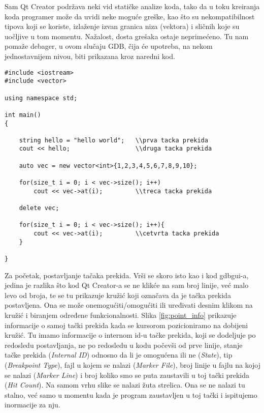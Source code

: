 \documentclass[a4paper]{article}
\begin{document}
Sam Qt Creator podržava neki vid statičke analize koda, tako da u toku kreiranja koda programer može da 
uvidi neke moguće greške, kao što su nekompatibilnost tipova koji se koriste, izlaženje izvan granica niza (vektora) 
i sličnih koje su uočljive u tom momentu. Nažalost, dosta grešaka ostaje neprimećeno. Tu nam pomaže debager,
u ovom slučaju GDB, čija će upotreba, na nekom jednostavnijem nivou, biti prikazana kroz naredni kod. 

\begin{lstlisting}[caption={Primer jednostavnog programa za prikaz rada GDB-a u Qt Creator-u},frame=single, label=simple]
#include <iostream>
#include <vector>

using namespace std;

int main()
{

    string hello = "hello world";   \\prva tacka prekida
    cout << hello;                  \\druga tacka prekida

    auto vec = new vector<int>{1,2,3,4,5,6,7,8,9,10};

    for(size_t i = 0; i < vec->size(); i++)
        cout << vec->at(i);         \\treca tacka prekida

    delete vec;

    for(size_t i = 0; i < vec->size(); i++){
        cout << vec->at(i);         \\cetvrta tacka prekida
    }

}
\end{lstlisting}

Za početak, postavljanje tačaka prekida. Vrši se skoro isto kao i kod gdbgui-a, jedina je razlika što kod Qt Creator-a
se ne klikće na sam broj linije, već malo levo od broja, te se tu prikazuje kružić koji označava da je
tačka prekida postavljena. Ona se može onemogućiti/omogućiti ili uređivati desnim klikom na kružić i biranjem određene funkcionalnosti.
Slika \ref{fig:point_info} prikazuje informacije o samoj tački prekida kada se
kursorom pozicioniramo na dobijeni kružić. Tu imamo informacije o internom id-u tačke prekida, koji se dodeljuje
po redosledu postavljanja, ne po redosledu u kodu počevši od prve linije, stanje tačke prekida (\textit{Internal ID}) 
odnosno da li je omogućena ili ne (\textit{State}), tip (\textit{Breakpoint Type}),
fajl u kojem se nalazi (\textit{Marker File}), broj linije u fajlu na kojoj se nalazi (\textit{Marker Line})
i broj koliko smo se puta zaustavili u toj tački prekida (\textit{Hit Count}).
Na samom vrhu slike se nalazi žuta strelica. Ona se ne nalazi tu stalno, već samo u momentu kada je program 
zaustavljen u toj tački i ispitujemo inormacije za nju.
\end{document}
